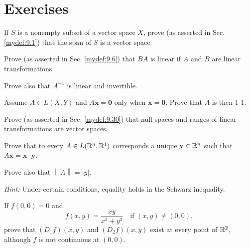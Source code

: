 
\section{Exercises}


\begin{myExercise}
    \label{ex:9.1}
    If $S$ is a nonempty subset of a vector space $X$, 
    prove (as asserted in Sec. \ref{mydef:9.1}) that
    the span of $S$ is a vector space.
\end{myExercise}


\begin{myExercise}
    \label{ex:9.2}
    Prove (as asserted in Sec. \ref{mydef:9.6}) that $BA$ is linear if $A$ and $B$ are linear transformations.
    
    Prove also that $A^{- 1}$ is linear and invertible.
\end{myExercise}


\begin{myExercise}
    \label{ex:9.3}
    Assume $A \in  L(X, Y)$ and $A\mathbf{x}= \mathbf{0}$ only when $\mathbf{x}= \mathbf{0}$. 
    Prove that $A$ is then 1-1.
\end{myExercise}


\begin{myExercise}
    \label{ex:9.4}
    Prove (as asserted in Sec. \ref{mydef:9.30}) that null spaces and ranges of linear transformations are vector spaces.
\end{myExercise}


\begin{myExercise}
    \label{ex:9.5}
    Prove that to every $A \in L({\protect\mathbb R}^n, {\protect\mathbb R}^1)$ corresponds a unique $\mathbf{y} \in {\protect\mathbb R}^n$ such that $A\mathbf{x = x \cdot y}$.
    
    Prove also that $\left\| A \right\| = \left| y \right| $.

    \emph{Hint:} Under certain conditions, equality holds in the Schwarz inequality.
\end{myExercise}


\begin{myExercise}
    \label{ex:9.6}
    If $f (0, 0) = 0$ and
    \begin{equation*}
        f(x, y) = \frac{xy}{x^2 + y^2} \quad\text{if } (x, y) \neq (0, 0),
    \end{equation*}
    prove that $(D_1f)(x, y)$ and $(D_2f)(x, y)$ exist at every point of ${\protect\mathbb R}^2$, although $f$ is not continuous at $(0, 0)$.
\end{myExercise}


